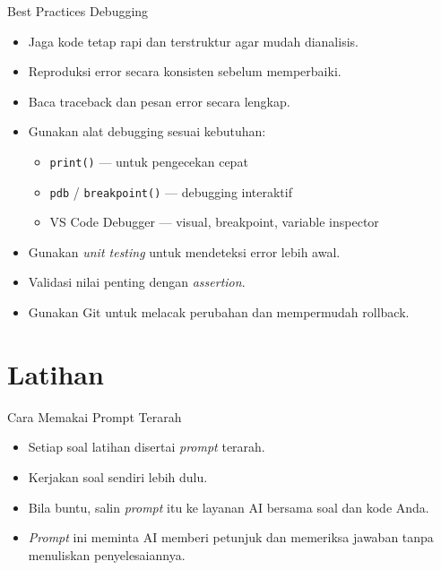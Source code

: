 \documentclass[aspectratio=169, table]{beamer}
\begin{document}
\begin{frame}{Best Practices Debugging}
\vspace{10pt}

\begin{itemize}
    \item Jaga kode tetap rapi dan terstruktur agar mudah dianalisis.
    \item Reproduksi error secara konsisten sebelum memperbaiki.
    \item Baca traceback dan pesan error secara lengkap.
    \item Gunakan alat debugging sesuai kebutuhan:
    \begin{itemize}
        \item \texttt{print()} — untuk pengecekan cepat
        \item \texttt{pdb} / \texttt{breakpoint()} — debugging interaktif
        \item VS Code Debugger — visual, breakpoint, variable inspector
    \end{itemize}
    \item Gunakan \textit{unit testing} untuk mendeteksi error lebih awal.
    \item Validasi nilai penting dengan \textit{assertion}.
    \item Gunakan Git untuk melacak perubahan dan mempermudah rollback.
\end{itemize}

\end{frame}

\section{Latihan}
\begin{frame}{Cara Memakai Prompt Terarah}
\begin{itemize}
\item Setiap soal latihan disertai \textit{prompt} terarah.
\item Kerjakan soal sendiri lebih dulu.
\item Bila buntu, salin \textit{prompt} itu ke layanan AI bersama soal dan kode Anda.
\item \textit{Prompt} ini meminta AI memberi petunjuk dan memeriksa jawaban tanpa menuliskan penyelesaiannya.
\end{itemize}
\end{frame}
\end{document}
